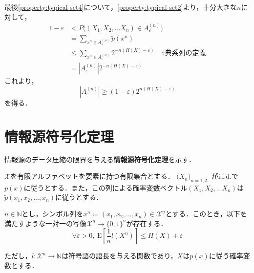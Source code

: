 \documentclass{classes/myclass}
\begin{document}
最後\ref{property:typical-set4}について，\ref{property:typical-set2}より，十分大きな$n$に対して，
\begin{align*}
  1 - \varepsilon 
  &< P\lparen (X_1, X_2, ... X_n) \in A_{\varepsilon}^{(n)} \rparen \\
  &= \sum_{x^n \in A_{\varepsilon}^{(n)}} \tilde{p}(x^n) \\
  &\leq \sum_{x^n \in A_{\varepsilon}^{(n)}} 2^{-n(H(X) - \varepsilon)} \quad \because \text{典系列の定義} \\
  &= |A_{\varepsilon}^{(n)}| 2^{-n(H(X) - \varepsilon)}
\end{align*}
これより，
\[
  |A_{\varepsilon}^{(n)}| \geq (1 - \varepsilon)2^{n(H(X) - \varepsilon)}
\]
を得る．

\section{情報源符号化定理}

情報源のデータ圧縮の限界を与える\textbf{情報源符号化定理}を示す．

\begin{thm}
$\mathcal{X}$を有限アルファベットを要素に持つ有限集合とする．
$\lparen X_n \rparen_{n = 1, 2...}$が$\mathrm{i.i.d.}$で$p(x)$に従うとする．また，この列による確率変数ベクトル$(X_1, X_2, ... X_n)$は$\tilde{p}(x_1, x_2, ..., x_n)$に従うとする．

$n \in \mathbb{N}$とし，シンボル列を$x^n \coloneq (x_1, x_2,..., x_n) \in \mathcal{X}^n$とする．このとき，以下を満たすような一対一の写像$\mathcal{X}^n \rightarrow \lbrace 0, 1 \rbrace^n$が存在する．
\[
  \forall \varepsilon > 0, \ \mathrm{E}\left \lbrack \frac{1}{n} l(X^n) \right \rbrack \leq H(X) + \varepsilon
\]

ただし，$l: \mathcal{X}^n \rightarrow \mathbb{N}$は符号語の語長を与える関数であり，$X$は$p(x)$に従う確率変数とする．

\end{thm}
\end{document}
